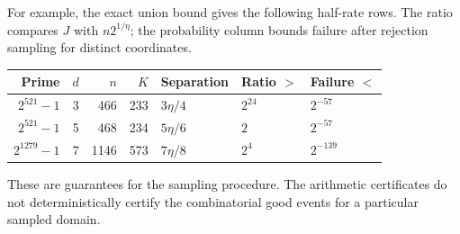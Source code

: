 For example, the exact union bound gives the following half-rate rows.
The ratio compares $J$ with $n2^{1/\eta}$; the probability column bounds
failure after rejection sampling for distinct coordinates.
\begin{center}
\begin{tabular}{@{}rrrrlll@{}}
\toprule
Prime & $d$ & $n$ & $K$ & Separation & Ratio $>$ & Failure $<$\\
\midrule
$2^{521}-1$&3&466&233&$3\eta/4$&$2^{24}$&$2^{-57}$\\
$2^{521}-1$&5&468&234&$5\eta/6$&$2$&$2^{-57}$\\
$2^{1279}-1$&7&1146&573&$7\eta/8$&$2^4$&$2^{-139}$\\
\bottomrule
\end{tabular}
\end{center}
These are guarantees for the sampling procedure. The arithmetic
certificates do not deterministically certify the combinatorial good
events for a particular sampled domain.
